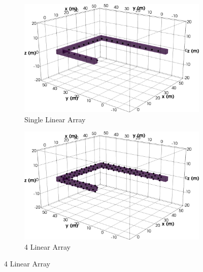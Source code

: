 \documentclass[preprint,authoryear,12pt]{elsarticle}
\begin{document}
\begin{figure}[htp]{}
   \begin{center}
      \begin{subfigure}{0.48\linewidth}
         \includegraphics[trim=0cm 0cm 0cm 0cm, clip=true,width=\linewidth]{./figures/Fig14a.png}
         \caption{Single Linear Array}
         \label{fig:Horseshoe_SLA_Oblique}
      \end{subfigure}
      \hspace{-0.7cm}
      \qquad
      \begin{subfigure}{0.48\linewidth}
         \includegraphics[trim=0cm 0cm 0cm 0cm, clip=true,width=\linewidth]{./figures/Fig14b.png}
         \caption{4 Linear Array}
         \label{fig:Horseshoe_4LA_Oblique}
      \end{subfigure}
      \vspace{0.4cm}


\end{center}
\end{figure}
\end{document}
